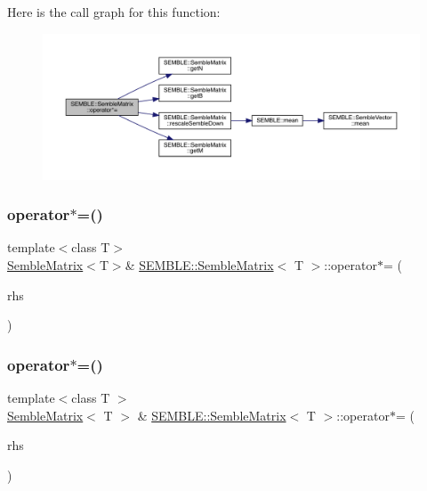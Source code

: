 Here is the call graph for this function\+:
\nopagebreak
\begin{figure}[H]
\begin{center}
\leavevmode
\includegraphics[width=350pt]{df/d87/structSEMBLE_1_1SembleMatrix_aa96c5b6adbf7c2a69d602d68d7abc863_cgraph}
\end{center}
\end{figure}
\mbox{\label{structSEMBLE_1_1SembleMatrix_a44e7f1c8ae0ecd6c4cb43978efbbad4c}} 
\subsubsection{\texorpdfstring{operator$\ast$=()}{operator*=()}\hspace{0.1cm}{\footnotesize\ttfamily [8/10]}}
{\footnotesize\ttfamily template$<$class T$>$ \\
\mbox{\hyperlink{structSEMBLE_1_1SembleMatrix}{Semble\+Matrix}}$<$T$>$\& \mbox{\hyperlink{structSEMBLE_1_1SembleMatrix}{S\+E\+M\+B\+L\+E\+::\+Semble\+Matrix}}$<$ T $>$\+::operator$\ast$= (\begin{DoxyParamCaption}\item[{const \mbox{\hyperlink{structSEMBLE_1_1SembleMatrix}{Semble\+Matrix}}$<$ T $>$ \&}]{rhs }\end{DoxyParamCaption})}

\mbox{\label{structSEMBLE_1_1SembleMatrix_a602798716caad1042d39dc1c9dfd2730}} 
\subsubsection{\texorpdfstring{operator$\ast$=()}{operator*=()}\hspace{0.1cm}{\footnotesize\ttfamily [9/10]}}
{\footnotesize\ttfamily template$<$class T $>$ \\
\mbox{\hyperlink{structSEMBLE_1_1SembleMatrix}{Semble\+Matrix}}$<$ T $>$ \& \mbox{\hyperlink{structSEMBLE_1_1SembleMatrix}{S\+E\+M\+B\+L\+E\+::\+Semble\+Matrix}}$<$ T $>$\+::operator$\ast$= (\begin{DoxyParamCaption}\item[{const itpp\+::\+Mat$<$ T $>$ \&}]{rhs }\end{DoxyParamCaption})}

